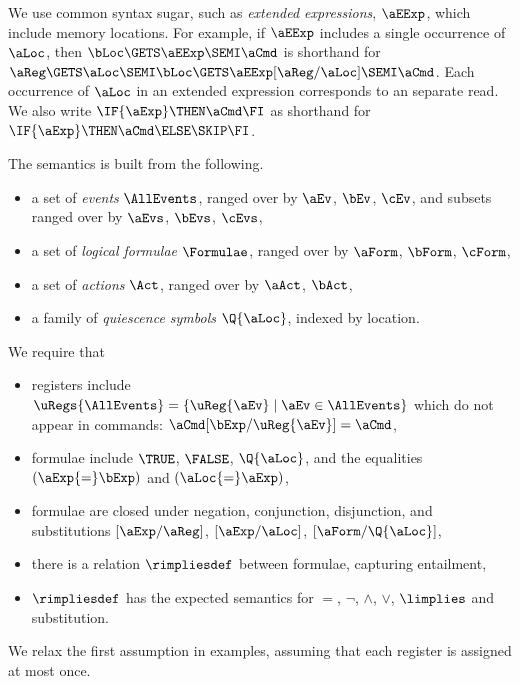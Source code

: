   
We use common syntax sugar, such as \emph{extended expressions}, $\aEExp$,
which include memory locations.  For example, if $\aEExp$ includes a single
occurrence of $\aLoc$, then $\bLoc\GETS\aEExp\SEMI \aCmd$ is shorthand for
$\aReg\GETS\aLoc\SEMI\bLoc\GETS\aEExp[\aReg/\aLoc]\SEMI \aCmd$.  Each
occurrence of $\aLoc$ in an extended expression corresponds to an separate
read.  We also write $\IF{\aExp} \THEN \aCmd \FI$ as shorthand for
$\IF{\aExp} \THEN \aCmd\ELSE \SKIP\FI$.



The semantics is built from the following.
\begin{itemize}
\item a set of \emph{events} $\AllEvents$, ranged over by $\aEv$, $\bEv$,
  $\cEv$, %
  and subsets ranged over by $\aEvs$, $\bEvs$, $\cEvs$,  
\item a set of \emph{logical formulae} $\Formulae$, ranged over by $\aForm$,
  $\bForm$, $\cForm$,
\item a set of \emph{actions} $\Act$, ranged over by $\aAct$, $\bAct$, 
\item a family of \emph{quiescence symbols} $\Q{\aLoc}$, indexed by location.
\end{itemize}

We require that
\begin{itemize}
\item registers include %
  $\uRegs{\AllEvents}=\{\uReg{\aEv}\mid\aEv\in\AllEvents\}$ which do not appear in commands:
  $\aCmd[\bExp/\uReg{\aEv}]=\aCmd$,
\item formulae include $\TRUE$, $\FALSE$, $\Q{\aLoc}$, and the equalities $(\aExp{=}\bExp)$ and $(\aLoc{=}\aExp)$,
\item formulae are closed under negation, conjunction, disjunction, and
  substitutions $[\aExp/\aReg]$, $[\aExp/\aLoc]$, $[\aForm/\Q{\aLoc}]$,
\item there is a relation $\rimpliesdef$ between
  formulae, capturing entailment, 
\item $\rimpliesdef$ has the expected semantics for $=$, $\lnot$, $\land$, $\lor$,
  $\limplies$ and substitution.
\end{itemize}
We relax the first assumption in examples, assuming that each register is
assigned at most once.

